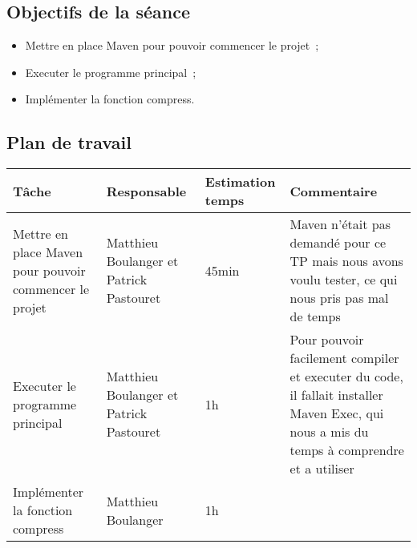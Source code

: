 \documentclass[a4paper,11pt]{article}
\begin{document}
\subsection{Objectifs de la séance}
\begin{itemize}
    \item Mettre en place Maven pour pouvoir commencer le projet~;
    \item Executer le programme principal~;
    \item Implémenter la fonction compress.
\end{itemize}

\subsection{Plan de travail}
\begin{center}
    \begin{tabular}{p{.3\linewidth}p{.3\linewidth}p{.3\linewidth}p{.3\linewidth}}
      \toprule
	Tâche & Responsable & Estimation temps & Commentaire \\
      \midrule
      Mettre en place Maven pour pouvoir commencer le projet & 
      Matthieu Boulanger et Patrick Pastouret & 
      45min & 
      Maven n'était pas demandé pour ce TP mais nous avons voulu tester, ce qui nous pris pas mal de temps \\
      Executer le programme principal &
      Matthieu Boulanger et Patrick Pastouret &
      1h &
      Pour pouvoir facilement compiler et executer du code, il fallait installer Maven Exec, qui nous a mis du temps à comprendre et a utiliser\\
      Implémenter la fonction compress &
      Matthieu Boulanger &
      1h &
      \\
      \bottomrule
   \end{tabular}
\end{center}
\end{document}
